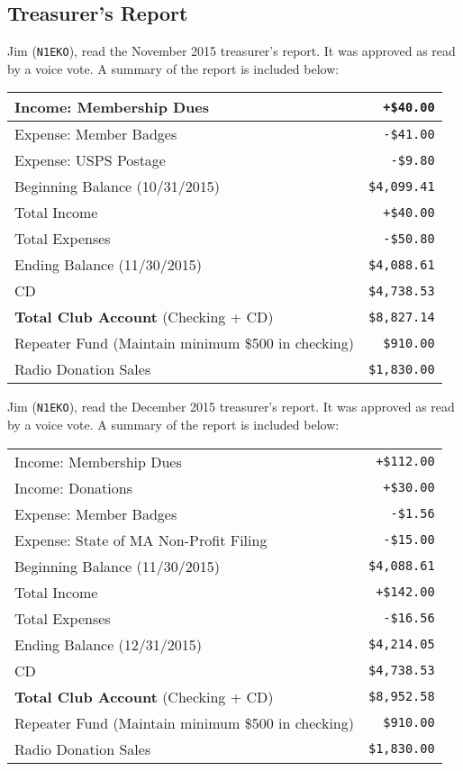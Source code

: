 \documentclass[10pt,letterpaper]{article}
\begin{document}
\subsection{Treasurer's Report}
Jim (\texttt{N1EKO}), read the November 2015 treasurer's report. It was approved as read by a voice vote. A summary of the report is included below:
\begin{center}
\noindent
\begin{tabular}{|l|r|}
  \hline
  Income: Membership Dues & \texttt{+\$40.00} \\
  \hline
  \hline
  Expense: Member Badges & \texttt{-\$41.00} \\
  Expense: USPS Postage & \texttt{-\$9.80} \\
  \hline
  \hline
  Beginning Balance (10/31/2015) & \texttt{\$4,099.41} \\
  Total Income & \texttt{+\$40.00} \\
  Total Expenses & \texttt{-\$50.80} \\
  Ending Balance (11/30/2015) & \texttt{\$4,088.61} \\
  \hline
  \hline
  CD & \texttt{\$4,738.53} \\
  \hline
  \hline
  \textbf{Total Club Account} (Checking + CD) & \texttt{\$8,827.14} \\
  Repeater Fund (Maintain minimum \$500 in checking) & \texttt{\$910.00} \\
  Radio Donation Sales & \texttt{\$1,830.00} \\
  \hline
\end{tabular}
\end{center}

\noindent
Jim (\texttt{N1EKO}), read the December 2015 treasurer's report. It was approved as read by a voice vote. A summary of the report is included below:

\begin{center}
\noindent
\begin{tabular}{|l|r|}
  \hline
  Income: Membership Dues & \texttt{+\$112.00} \\
  Income: Donations & \texttt{+\$30.00} \\
  \hline
  \hline
  Expense: Member Badges & \texttt{-\$1.56} \\
  Expense: State of MA Non-Profit Filing & \texttt{-\$15.00} \\
  \hline
  \hline
  Beginning Balance (11/30/2015) & \texttt{\$4,088.61} \\
  Total Income & \texttt{+\$142.00} \\
  Total Expenses & \texttt{-\$16.56} \\
  Ending Balance (12/31/2015) & \texttt{\$4,214.05} \\
  \hline
  \hline
  CD & \texttt{\$4,738.53} \\
  \hline
  \hline
  \textbf{Total Club Account} (Checking + CD) & \texttt{\$8,952.58} \\
  Repeater Fund (Maintain minimum \$500 in checking) & \texttt{\$910.00} \\
  Radio Donation Sales & \texttt{\$1,830.00} \\
  \hline
\end{tabular}
\end{center}
\end{document}
